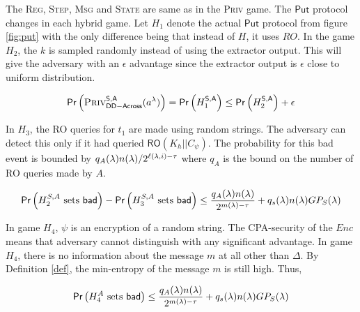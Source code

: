 The \textsc{Reg, Step, Msg} and \textsc{State} are same as in the \textsc{Priv} game. The $\mathsf{Put}$ protocol changes in each hybrid game.
Let $H_1$ denote the actual $\mathsf{Put}$ protocol from figure \ref{fig:put} with the only difference being that instead of $H$, it uses $RO$. In the game $H_2$, the $k$ is sampled randomly instead of using the extractor output. This will give the adversary with an $\epsilon$ advantage since the extractor output is $\epsilon$ close to uniform distribution.

\begin{equation}
\mathsf{Pr}\left(\textsc{Priv}_{\mathsf{DD-Across}}^{\mathsf{S,A}}(a^\lambda)\right) = \mathsf{Pr}\left(H_1^{\mathsf{S,A}}\right) \leq \mathsf{Pr}\left(H_2^{\mathsf{S,A}}\right) + \epsilon
\end{equation}

In $H_3$, the RO queries for $t_1$ are made using random strings. The adversary can detect this only if it had queried $\mathsf{RO}(K_h||C_\psi)$. The probability for this bad event is bounded by $q_A(\lambda)n(\lambda)/2^{\ell(\lambda, i) - \tau}$ where $q_A$ is the bound on the number of RO queries made by $A$.

\begin{equation}
\mathsf{Pr}\left(H_2^{S,A} \text{ sets }\mathsf{bad}\right) -
\mathsf{Pr}\left(H_3^{S,A} \text{ sets }\mathsf{bad}\right)  \leq \frac{q_A(\lambda)n(\lambda)}{2^{m(\lambda) - \tau}}  + q_s(\lambda)n(\lambda)GP_S(\lambda)
\end{equation}

In game $H_4$, $\psi$ is an encryption of a random string. The CPA-security of the $\mathit{Enc}$ means that adversary cannot distinguish with any significant advantage. In game $H_4$, there is no information about the message $m$ at all other than $\Delta$. By Definition \ref{def}, the min-entropy of the message $m$ is still high. Thus,

\begin{equation}
\mathsf{Pr}\left(H_4^{A} \text{ sets }\mathsf{bad}\right) \leq  \frac{q_A(\lambda)n(\lambda)}{2^{m(\lambda) - \tau}} + q_s(\lambda)n(\lambda)GP_S(\lambda)
\end{equation}


